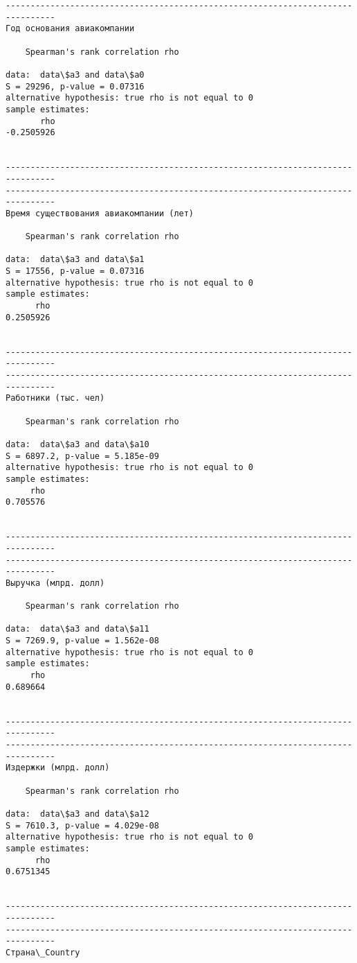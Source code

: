 \documentclass[11pt,mathletters]{article}
\begin{document}
    \begin{Verbatim}[commandchars=\\\{\}]
--------------------------------------------------------------------------------
Год основания авиакомпании

	Spearman's rank correlation rho

data:  data\$a3 and data\$a0
S = 29296, p-value = 0.07316
alternative hypothesis: true rho is not equal to 0
sample estimates:
       rho 
-0.2505926 


--------------------------------------------------------------------------------
--------------------------------------------------------------------------------
Время существования авиакомпании (лет)

	Spearman's rank correlation rho

data:  data\$a3 and data\$a1
S = 17556, p-value = 0.07316
alternative hypothesis: true rho is not equal to 0
sample estimates:
      rho 
0.2505926 


--------------------------------------------------------------------------------
--------------------------------------------------------------------------------
Работники (тыс. чел)

	Spearman's rank correlation rho

data:  data\$a3 and data\$a10
S = 6897.2, p-value = 5.185e-09
alternative hypothesis: true rho is not equal to 0
sample estimates:
     rho 
0.705576 


--------------------------------------------------------------------------------
--------------------------------------------------------------------------------
Выручка (млрд. долл)

	Spearman's rank correlation rho

data:  data\$a3 and data\$a11
S = 7269.9, p-value = 1.562e-08
alternative hypothesis: true rho is not equal to 0
sample estimates:
     rho 
0.689664 


--------------------------------------------------------------------------------
--------------------------------------------------------------------------------
Издержки (млрд. долл)

	Spearman's rank correlation rho

data:  data\$a3 and data\$a12
S = 7610.3, p-value = 4.029e-08
alternative hypothesis: true rho is not equal to 0
sample estimates:
      rho 
0.6751345 


--------------------------------------------------------------------------------
--------------------------------------------------------------------------------
Страна\_Country


\end{Verbatim}
\end{document}
